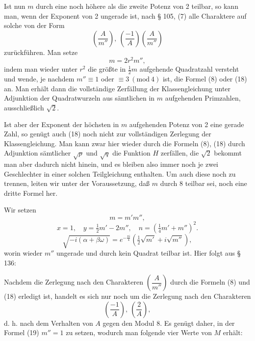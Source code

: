 Ist nun $m$ durch eine noch höhere als die zweite Potenz von 2 teilbar, so kann man, wenn der Exponent von 2 ungerade ist, nach § 105, (7) alle Charaktere auf solche von der Form
\[
\left(\frac{A}{m''}\right), \ \left(\frac{-1}{A}\right)\left(\frac{A}{m''}\right)
\]
zurückführen. Man setze
\[
m = 2r^2 m'',
\]
indem man wieder unter $r^2$ die größte in $\tfrac12 m$ aufgehende Quadratzahl versteht und wende, je nachdem $m'' \equiv 1$ oder $\equiv 3\ (\mathrm{mod}\ 4)$ ist, die Formel (8) oder (18) an. Man erhält dann die vollständige Zerfällung der Klassengleichung unter Adjunktion der Quadratwurzeln aus sämtlichen in $m$ aufgehenden Primzahlen, ausschließlich $\sqrt2$.

Ist aber der Exponent der höchsten in $m$ aufgehenden Potenz von 2 eine gerade Zahl, so genügt auch (18) noch nicht zur vollständigen Zerlegung der Klassengleichung. Man kann zwar hier wieder durch die Formeln (8), (18) durch Adjunktion sämtlicher $\sqrt p$ und $\sqrt q$ die Funktion $H$ zerfällen, die $\sqrt2$ bekommt man aber dadurch nicht hinein, und es bleiben also immer noch je zwei Geschlechter in einer solchen Teilgleichung enthalten. Um auch diese noch zu trennen, leiten wir unter der Voraussetzung, daß $m$ durch 8 teilbar sei, noch eine dritte Formel her.

Wir setzen
\[
m = m'm'',
\]
\[
x = 1, \quad y = \tfrac12 m' - 2m'', \quad n = \left(\tfrac14 m' + m''\right)^2.
\]
\[
\sqrt{-i(\alpha+\beta\omega)} = e^{-\frac{\pi i}{4}}\left(\tfrac12\sqrt{m'} + i\sqrt{m''}\right),
\]
worin wieder $m''$ ungerade und durch kein Quadrat teilbar ist. Hier folgt aus § 136:

Nachdem die Zerlegung nach den Charakteren $\left(\dfrac{A}{m''}\right)$ durch die Formeln (8) und (18) erledigt ist, handelt es sich nur noch um die Zerlegung nach den Charakteren
\[
\left(\frac{-1}{A}\right), \ \left(\frac{2}{A}\right),
\]
d. h. nach dem Verhalten von $A$ gegen den Modul 8. Es genügt daher, in der Formel (19) $m'' = 1$ zu setzen, wodurch man folgende vier Werte von $M$ erhält:

